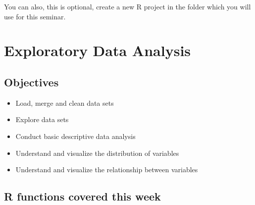 \documentclass[
]{book}
\providecommand{\tightlist}{%
  \setlength{\itemsep}{0pt}\setlength{\parskip}{0pt}}
\begin{document}
You can also, this is optional, create a new R project in the folder which you will use for this seminar.

\hypertarget{eda-1}{%
\chapter{Exploratory Data Analysis}\label{eda-1}}

\hypertarget{objectives}{%
\section{Objectives}\label{objectives}}

\begin{itemize}
\tightlist
\item
  Load, merge and clean data sets
\item
  Explore data sets
\item
  Conduct basic descriptive data analysis
\item
  Understand and visualize the distribution of variables
\item
  Understand and visualize the relationship between variables
\end{itemize}

\hypertarget{r-functions-covered-this-week}{%
\section{R functions covered this week}\label{r-functions-covered-this-week}}
\end{document}
